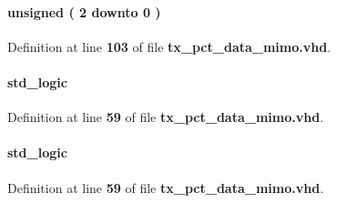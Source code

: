 \paragraph[{rd\+\_\+en\+\_\+cnt}]{ {\bfseries \textcolor{comment}{unsigned}\textcolor{vhdlchar}{ }\textcolor{vhdlchar}{(}\textcolor{vhdlchar}{ }\textcolor{vhdlchar}{ } \textcolor{vhdldigit}{2} \textcolor{vhdlchar}{ }\textcolor{keywordflow}{downto}\textcolor{vhdlchar}{ }\textcolor{vhdlchar}{ } \textcolor{vhdldigit}{0} \textcolor{vhdlchar}{ }\textcolor{vhdlchar}{)}\textcolor{vhdlchar}{ }} \hspace{0.3cm}{\ttfamily [Signal]}}\label{classtx__pct__data__mimo_1_1arch_a71090c11375413e9d02af8fde18e15fa}


Definition at line {\bf 103} of file {\bf tx\+\_\+pct\+\_\+data\+\_\+mimo.\+vhd}.

\paragraph[{rdreq0}]{ {\bfseries \textcolor{comment}{std\+\_\+logic}\textcolor{vhdlchar}{ }} \hspace{0.3cm}{\ttfamily [Signal]}}\label{classtx__pct__data__mimo_1_1arch_aa7f737e1f8b4444761687d64456ed215}


Definition at line {\bf 59} of file {\bf tx\+\_\+pct\+\_\+data\+\_\+mimo.\+vhd}.

\paragraph[{rdreq1}]{ {\bfseries \textcolor{comment}{std\+\_\+logic}\textcolor{vhdlchar}{ }} \hspace{0.3cm}{\ttfamily [Signal]}}\label{classtx__pct__data__mimo_1_1arch_abd5220fb4e62ccd13f4ea39985fd52ce}


Definition at line {\bf 59} of file {\bf tx\+\_\+pct\+\_\+data\+\_\+mimo.\+vhd}.

